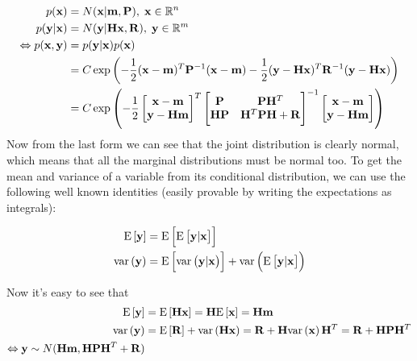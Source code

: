 \documentclass[a4paper,oneside,article]{memoir}
\begin{document}
\begin{align}
	p(\v{x})&=N(\v{x}|\v{m},\v{P}),\;\v{x}\in\R^n\\
	p(\v{y}|\v{x})&=N(\v{y}|\v{H}\v{x},\v{R}),\;\v{y}\in\R^m\\
	\Leftrightarrow p(\v{x},\v{y})&=p(\v{y}|\v{x})p(\v{x})\\
	&=C\exp\left(-\frac{1}{2}(\v{x}-\v{m})^T\v{P}^{-1}(\v{x}-\v{m})-\frac{1}{2}(\v{y}-\v{H}\v{x})^T\v{R}^{-1}(\v{y}-\v{H}\v{x})\right)\\
	&=C\exp\left(-\frac{1}{2}
	\begin{bmatrix}
		\v{x}-\v{m}\\
		\v{y}-\v{H}\v{m}
	\end{bmatrix}^T
	\begin{bmatrix}
		\v{P}&\v{P}\v{H}^T\\
		\v{H}\v{P}&\v{H}^T\v{P}\v{H}+\v{R}
	\end{bmatrix}^{-1}
	\begin{bmatrix}
		\v{x}-\v{m}\\
		\v{y}-\v{H}\v{m}
	\end{bmatrix}
	\right)
\end{align}
Now from the last form we can see that the joint distribution is clearly normal, which means that
all the marginal distributions must be normal too. To get the mean and variance of a 
variable from its conditional distribution, we can use the following
well known identities (easily provable by writing the expectations as integrals):

\begin{align}
	\E{\v{y}}&=\E{\E{\v{y}|\v{x}}}\\
	\var{\v{y}}&=\E{\var{\v{y}|\v{x}}}+\var{\E{\v{y}|\v{x}}}
\end{align}

Now it's easy to see that
\begin{align}
	\E{\v{y}}&=\E{\v{H}\v{x}}=\v{H}\E{\v{x}}=\v{H}\v{m}\\
	\var{\v{y}}&=\E{\v{R}}+\var{\v{H}\v{x}}=\v{R}+\v{H}\var{\v{x}}\v{H}^T=\v{R}+\v{H}\v{P}\v{H}^T\\
	\Leftrightarrow \v{y} \sim N(\v{H}\v{m},\v{H}\v{P}\v{H}^T+\v{R})
\end{align}

\subsubsection{}
\end{document}
